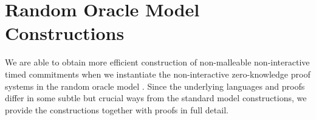 \section{Random Oracle Model Constructions}\label{sec:rom-const}
We are able to obtain more efficient construction of non-malleable non-interactive timed commitments when we instantiate the non-interactive zero-knowledge proof systems in the random oracle model \cite{CCS:BelRog93}. Since the underlying languages and proofs differ in some subtle but crucial ways from the standard model constructions, we provide the constructions together with proofs in full detail.




